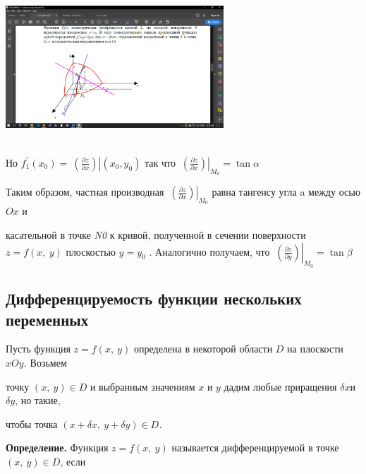 \includegraphics[width=3.21631in,height=2.24359in]{23img.png}

Но
$f_{1}^{'}\left( x_{0} \right) = \left. \ \left( \frac{\partial z}{\partial x} \right) \right|\left( x_{0},y_{0} \right)$
так что
$\left. \ \left( \frac{\partial z}{\partial x} \right) \right|_{M_{0}} = \tan\alpha$

Таким образом, частная производная
$\left. \ \left( \frac{\partial z}{\partial x} \right) \right|_{M_{0}}$
равна тангенсу угла a между осью $Ox$ и

касательной в точке \emph{N0} к кривой, полученной в сечении поверхности
$z = f(x,\ y)$ плоскостью $y = y_{0}$ . Аналогично получаем, что
$\left. \ \left( \frac{\partial z}{\partial y} \right) \right|_{M_{0}} = \tan\beta$

\hypertarget{ux434ux438ux444ux444ux435ux440ux435ux43dux446ux438ux440ux443ux435ux43cux43eux441ux442ux44c-ux444ux443ux43dux43aux446ux438ux438-ux43dux435ux441ux43aux43eux43bux44cux43aux438ux445-ux43fux435ux440ux435ux43cux435ux43dux43dux44bux445}{%
\subsection{\texorpdfstring{\textbf{Дифференцируемость функции
нескольких
переменных}}{Дифференцируемость функции нескольких переменных}}\label{ux434ux438ux444ux444ux435ux440ux435ux43dux446ux438ux440ux443ux435ux43cux43eux441ux442ux44c-ux444ux443ux43dux43aux446ux438ux438-ux43dux435ux441ux43aux43eux43bux44cux43aux438ux445-ux43fux435ux440ux435ux43cux435ux43dux43dux44bux445}}

Пусть функция $z = f(x,\ y)$ определена в некоторой области $D$ на
плоскости $xOy$\emph{.} Возьмем

точку $(x,\ y) \in D$ и выбранным значениям $x$ и $y$ дадим любые
приращения $\delta x $и $\delta y$, но такие,

чтобы точка $(x + \delta x,\ y + \delta y) \in D$\emph{.}

\textbf{Определение.} Функция $z = f(x,\ y)$ называется
дифференцируемой в точке $(x,\ y) \in D$, если

